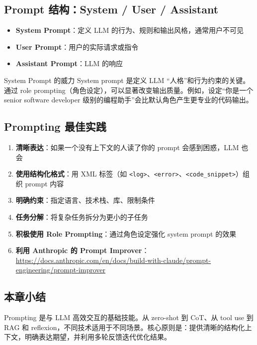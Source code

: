 \documentclass[a4paper]{article}
\begin{document}
\subsection{Prompt 结构：System / User / Assistant}

\begin{itemize}
    \item \textbf{System Prompt}：定义 LLM 的行为、规则和输出风格，通常用户不可见
    \item \textbf{User Prompt}：用户的实际请求或指令
    \item \textbf{Assistant Prompt}：LLM 的响应
\end{itemize}

\begin{knowledgebox}{System Prompt 的威力}
System prompt 是定义 LLM ``人格''和行为约束的关键。通过 role prompting（角色设定），可以显著改变输出质量。例如，设定``你是一个 senior software developer 级别的编程助手''会比默认角色产生更专业的代码输出。
\end{knowledgebox}

\subsection{Prompting 最佳实践}

\begin{enumerate}
    \item \textbf{清晰表达}：如果一个没有上下文的人读了你的 prompt 会感到困惑，LLM 也会
    \item \textbf{使用结构化格式}：用 XML 标签（如 \texttt{<log>}、\texttt{<error>}、\texttt{<code\_snippet>}）组织 prompt 内容
    \item \textbf{明确约束}：指定语言、技术栈、库、限制条件
    \item \textbf{任务分解}：将复杂任务拆分为更小的子任务
    \item \textbf{积极使用 Role Prompting}：通过角色设定强化 system prompt 的效果
    \item \textbf{利用 Anthropic 的 Prompt Improver}：\url{https://docs.anthropic.com/en/docs/build-with-claude/prompt-engineering/prompt-improver}
\end{enumerate}

\subsection{本章小结}

Prompting 是与 LLM 高效交互的基础技能。从 zero-shot 到 CoT、从 tool use 到 RAG 和 reflexion，不同技术适用于不同场景。核心原则是：提供清晰的结构化上下文，明确表达期望，并利用多轮反馈迭代优化结果。
\end{document}
